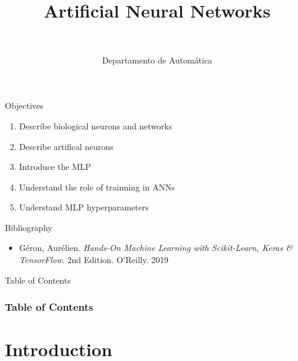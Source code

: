 \documentclass[10pt,compress]{beamer} %
\title[Aritificial Neural Networks]{Artificial Neural Networks}
\author{\asignatura\\\carrera}
\institute{}
\date{Departamento de Automática}
\begin{document}
{\titlepageBlue
    \begin{frame}
        \titlepage
    \end{frame}
}

\institute{\asignatura}

\begin{frame}[plain]{}
   \begin{block}{Objectives}
      \begin{enumerate}
         \item Describe biological neurons and networks
         \item Describe artifical neurons
	 \item Introduce the MLP
         \item Understand the role of trainning in ANNs
	 \item Understand MLP hyperparameters
      \end{enumerate} 
   \end{block}

   \begin{block}{Bibliography}
	\begin{itemize}
        \item G\'eron, Aur\'elien. \textit{Hands-On Machine Learning with Scikit-Learn, Keras \& TensorFlow}. 2nd Edition. O'Reilly. 2019
	\end{itemize}
   \end{block}
\end{frame}

{
\begin{frame}[shrink]{Table of Contents}
 \frametitle{Table of Contents}

    \begin{multicols}{2}
    \tableofcontents
    \end{multicols}
\end{frame}
}

\section{Introduction}
\end{document}
